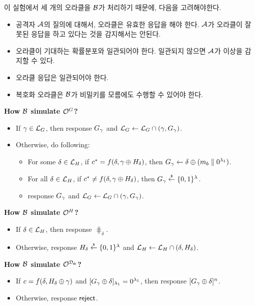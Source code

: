 \documentclass{article}
\begin{document}
이 실험에서 세 개의 오라클을 $\mathcal{B}$가 처리하기 때문에, 다음을 고려해야한다.
\begin{itemize}
	\item 공격자 $\mathcal{A}$의 질의에 대해서, 오라클은 유효한 응답을 해야 한다. $\mathcal{A}$가
	오라클이 잘못된 응답을 하고 있다는 것을 감지해서는 안된다.
	\item 오라클이 기대하는 확률분포와 일관되어야 한다. 일관되지 않으면 $\mathcal{A}$가
	이상을 감지할 수 있다.
	\item 오라클 응답은 일관되어야 한다.
	\item 복호화 오라클은 $\mathcal{B}$가 비밀키를 모름에도 수행할 수 있어야 한다.
\end{itemize}

\textbf{How $\mathcal{B}$ simulate $\mathcal{O}^{G}$?}

\begin{itemize}
	\item If $\gamma \in \mathcal{L}_{G}$, then response $G_{\gamma}$
	and $\mathcal{L}_{G} \gets \mathcal{L}_{G} \cap (\gamma, G_{\gamma})$.
	\item Otherwise, do following:
	\begin{itemize}
		\item For some $\delta \in \mathcal{L}_{H}$, if $c^* = f(\delta, \gamma \oplus
		H_{\delta})$, then $G_{\gamma} \gets \delta \oplus (m_{b} \parallel
		0^{\lambda_1})$.
		\item For all $\delta \in \mathcal{L}_{H}$, if $c^* \neq f(\delta, \gamma \oplus
		H_{\delta})$, then $G_{\gamma} \overset{{\scriptscriptstyle\$}}{\leftarrow} \{0 ,1\}^{\lambda}$.
		\item response $G_{\gamma}$ and $\mathcal{L}_{G} \gets \mathcal{L}_{G} \cap
		(\gamma, G_{\gamma})$.
	\end{itemize}
\end{itemize}

\textbf{How $\mathcal{B}$ simulate $\mathcal{O}^{H}$?}

\begin{itemize}
	\item If $\delta \in \mathcal{L}_{H}$, then response $\hash_\delta$.
	\item Otherwise, response $H_{\delta} \overset{{\scriptscriptstyle\$}}{\leftarrow} \{0 ,1\}^{\lambda}$ and
	$\mathcal{L}_{H} \gets \mathcal{L}_{H} \cap (\delta, H_{\delta})$.
\end{itemize}

\textbf{How $\mathcal{B}$ simulate $\mathcal{O}^{\mathcal{D}_{\textsf{sk}}}$?} 

\begin{itemize}
	\item If $c = f(\delta, H_{\delta} \oplus \gamma)$ and 
	$[G_{\gamma} \oplus \delta]_{\lambda_1} = 0^{\lambda_1}$, then
	response $[G_{\gamma} \oplus \delta]^n$.
	\item Otherwise, response $\textsf{reject}$.
\end{itemize}
\end{document}
